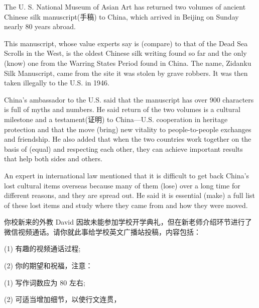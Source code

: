 \documentclass{英语试卷}
\begin{document}
\par The U. S. National Museum of Asian Art has returned two volumes of ancient Chinese silk manuscript(手稿) to China, which arrived in Beijing on Sunday \blanknum{} \blanknum{} nearly 80 years abroad.\par
\par This manuscript, whose value experts say is  (compare) to that of the Dead Sea Scrolls in the West, is the oldest Chinese silk writing found so far and the only  (know) one from the Warring States Period found in China. The name, Zidanku Silk Manuscript, came from the site  it was stolen by grave robbers. It was then taken illegally to the U.S. in 1946.\par
\par China's ambassador to the U.S. said that the manuscript has over 900 characters  is full of myths and numbers. He said  return of the two volumes is a cultural milestone and a testament(证明) to China—U.S. cooperation in heritage protection and that the move  (bring) new vitality to people-to-people exchanges and friendship. He also added that when the two countries work together on the basis of  (equal) and respecting each other, they can achieve important results that help both sides and others.\par
\par An expert in international law mentioned that it is difficult to get back China's lost cultural items overseas because many of them  (lose) over a long time for different reasons, and they are spread out. He said it is essential  (make) a full list of these lost items and study where they came from and how they were moved.\par
{}
\par 你校新来的外教 David 因故未能参加学校开学典礼，但在新老师介绍环节进行了微信视频通话。请你就此事给学校英文广播站投稿，内容包括：\par
\par (1) 有趣的视频通话过程;\par
\par (2) 你的期望和祝福，注意：\par
\par (1) 写作词数应为 80 左右;\par
\par (2) 可适当增加细节，以使行文连贯，\par
\end{document}

